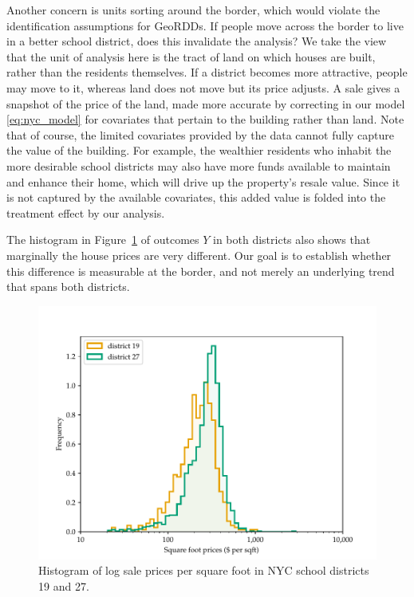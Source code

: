\documentclass[letter]{article}
\makeatletter
\def\maxwidth{\ifdim\Gin@nat@width>\linewidth\linewidth
\else\Gin@nat@width\fi}
\let\Oldincludegraphics\includegraphics
\renewcommand{\includegraphics}[1]{\Oldincludegraphics[width=0.9\maxwidth]{#1}}
\makeatother
\begin{document}
Another concern is units sorting around the border, which would violate the identification assumptions for GeoRDDs.
If people move across the border to live in a better school district, does this invalidate the analysis?
We take the view that the unit of analysis here is the tract of land on which houses are built, rather than the residents themselves.
If a district becomes more attractive, people may move to it, whereas land does not move but its price adjusts.
A sale gives a snapshot of the price of the land, made more accurate by correcting in our model \eqref{eq:nyc_model} for covariates that pertain to the building rather than land.
Note that of course, the limited covariates provided by the data cannot fully capture the value of the building.
For example, the wealthier residents who inhabit the more desirable school districts may also have more funds available to maintain and enhance their home, which will drive up the property's resale value.
Since it is not captured by the available covariates, this added value is folded into the treatment effect by our analysis.

The histogram in Figure~\ref{fig:NYC_histogram} of outcomes \(Y\) in both districts also shows that marginally the house prices are very different.
Our goal is to establish whether this difference is measurable at the border, and not merely an underlying trend that spans both districts.

\begin{figure}
\centering
\includegraphics{../NYC/NYC_plots/sales_histogram_19-27.pdf}
\caption{\label{fig:NYC_histogram}Histogram of log sale prices per square foot in NYC school districts 19 and 27.}
\end{figure}
    
\end{document}
